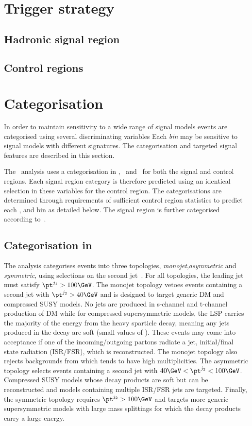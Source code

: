\section{Trigger strategy}
\label{sec:ana-trigger}
\subsection{Hadronic signal region}
\subsection{Control regions}

\section{Categorisation}
\label{sec:cat}
In order to maintain sensitivity to a wide range of signal models events are categorised using
several discriminating variables Each \emph{bin} may be sensitive to signal models with different 
signatures. The categorisation and targeted signal features are described in this section.

The \alphat~analysis uses a categorisation in \njet, \nb~and \scalht~for both 
the signal and control regions. Each signal region category is therefore predicted using an identical 
selection in these variables for the control region. The categorisations are determined through requirements of sufficient
control region statistics to predict each \njet, \nb and \scalht bin as detailed below. The signal region is 
further categorised according to~\mht. 

\subsection{Categorisation in \njet}

The \alphat analysis categorises events into three topologies, \emph{monojet},\emph{asymmetric} 
and \emph{symmetric}, using selections on the second jet~\pt. For all topologies, the leading
jet must satisfy $\pt^{j_1} > 100 \GeV$.  The monojet topology vetoes events containing a second 
jet with $\pt^{j_2} > 40 \GeV$ and is designed to target generic DM 
and compressed SUSY models. No jets are produced in s-channel and t-channel production of DM
while for compressed supersymmetric models, the LSP carries the majority of the energy from 
the heavy sparticle decay, meaning any jets produced in the decay are soft (small values of \pt). 
These events may come into acceptance if one of the incoming/outgoing partons radiate a jet, initial/final state
radiation (ISR/FSR), which is reconstructed. The monojet topology also rejects backgrounds from 
\ttbar which tends to have high \njet multiplicities. The asymmetric topology selects events 
containing a second jet with $40 \GeV < \pt^{j_2} < 100 \GeV$.
Compressed SUSY models whose decay products are soft but can be reconstructed and models
containing multiple ISR/FSR jets are targeted. Finally, the symmetric topology requires  
$\pt^{j_2} > 100 \GeV$ and targets more generic supersymmetric models with large mass splittings 
for which the decay products carry a large energy.

